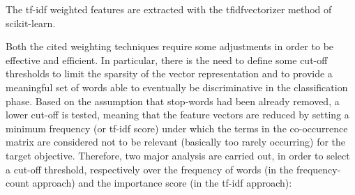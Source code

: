 \documentclass[10pt]{article}
\begin{document}
\begin{itemize}
The tf-idf weighted features are extracted with the tfidfvectorizer method of scikit-learn.
\end{itemize}

Both the cited weighting techniques require some adjustments in order to be effective and efficient. 
In particular, there is the need to define some cut-off thresholds to limit the sparsity of the vector representation and to provide a meaningful set of words able to eventually be discriminative in the classification phase.
Based on the assumption that stop-words had been already removed, a lower cut-off is tested, meaning that the feature vectors are reduced by setting a minimum frequency (or tf-idf score) under which the terms in the co-occurrence matrix are considered not to be relevant (basically too rarely occurring) for the target objective.
Therefore, two major analysis are carried out, in order to select a cut-off threshold, respectively over the frequency of words (in the frequency-count approach) and the importance score (in the tf-idf approach):
\end{document}
